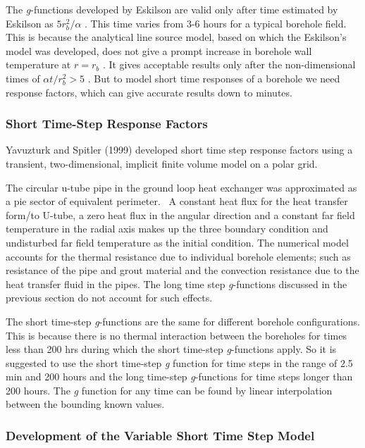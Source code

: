 The \emph{g}-functions developed by Eskilson are valid only after time estimated by Eskilson as \(5r_b^2/\alpha\) . This time varies from 3-6 hours for a typical borehole field. This is because the analytical line source model, based on which the Eskilson's model was developed, does not give a prompt increase in borehole wall temperature at \(r = {r_b}\) . It gives acceptable results only after the non-dimensional times of \(\alpha t/r_b^2 > 5\) . But to model short time responses of a borehole we need response factors, which can give accurate results down to minutes.

\subsubsection{Short Time-Step Response Factors}\label{short-time-step-response-factors}

Yavuzturk and Spitler (1999) developed short time step response factors using a transient, two-dimensional, implicit finite volume model on a polar grid.

The circular u-tube pipe in the ground loop heat exchanger was approximated as a pie sector of equivalent perimeter.~ A constant heat flux for the heat transfer form/to U-tube, a zero heat flux in the angular direction and a constant far field temperature in the radial axis makes up the three boundary condition and undisturbed far field temperature as the initial condition. The numerical model accounts for the thermal resistance due to individual borehole elements; such as resistance of the pipe and grout material and the convection resistance due to the heat transfer fluid in the pipes. The long time step \emph{g}-functions discussed in the previous section do not account for such effects.

The short time-step \emph{g}-functions are the same for different borehole configurations. This is because there is no thermal interaction between the boreholes for times less than 200 hrs during which the short time-step \emph{g}-functions apply. So it is suggested to use the short time-step \emph{g} function for time steps in the range of 2.5 min and 200 hours and the long time-step \emph{g}-functions for time steps longer than 200 hours. The \emph{g} function for any time can be found by linear interpolation between the bounding known values.

\subsubsection{Development of the Variable Short Time Step Model}\label{development-of-the-variable-short-time-step-model}

